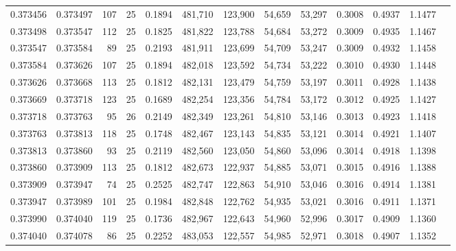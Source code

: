 \begin{tabular}{rrrrrrrrrrrrr}
0.373456 & 0.373497 &   107 &  25 &                                     0.1894 & 481,710 & 123,900 &  54,659 &  53,297 & 0.3008 & 0.4937 & 1.1477 \\
0.373498 & 0.373547 &   112 &  25 &                                     0.1825 & 481,822 & 123,788 &  54,684 &  53,272 & 0.3009 & 0.4935 & 1.1467 \\
0.373547 & 0.373584 &    89 &  25 &                                     0.2193 & 481,911 & 123,699 &  54,709 &  53,247 & 0.3009 & 0.4932 & 1.1458 \\
0.373584 & 0.373626 &   107 &  25 &                                     0.1894 & 482,018 & 123,592 &  54,734 &  53,222 & 0.3010 & 0.4930 & 1.1448 \\
0.373626 & 0.373668 &   113 &  25 &                                     0.1812 & 482,131 & 123,479 &  54,759 &  53,197 & 0.3011 & 0.4928 & 1.1438 \\
0.373669 & 0.373718 &   123 &  25 &                                     0.1689 & 482,254 & 123,356 &  54,784 &  53,172 & 0.3012 & 0.4925 & 1.1427 \\
0.373718 & 0.373763 &    95 &  26 &                                     0.2149 & 482,349 & 123,261 &  54,810 &  53,146 & 0.3013 & 0.4923 & 1.1418 \\
0.373763 & 0.373813 &   118 &  25 &                                     0.1748 & 482,467 & 123,143 &  54,835 &  53,121 & 0.3014 & 0.4921 & 1.1407 \\
0.373813 & 0.373860 &    93 &  25 &                                     0.2119 & 482,560 & 123,050 &  54,860 &  53,096 & 0.3014 & 0.4918 & 1.1398 \\
0.373860 & 0.373909 &   113 &  25 &                                     0.1812 & 482,673 & 122,937 &  54,885 &  53,071 & 0.3015 & 0.4916 & 1.1388 \\
0.373909 & 0.373947 &    74 &  25 &                                     0.2525 & 482,747 & 122,863 &  54,910 &  53,046 & 0.3016 & 0.4914 & 1.1381 \\
0.373947 & 0.373989 &   101 &  25 &                                     0.1984 & 482,848 & 122,762 &  54,935 &  53,021 & 0.3016 & 0.4911 & 1.1371 \\
0.373990 & 0.374040 &   119 &  25 &                                     0.1736 & 482,967 & 122,643 &  54,960 &  52,996 & 0.3017 & 0.4909 & 1.1360 \\
0.374040 & 0.374078 &    86 &  25 &                                     0.2252 & 483,053 & 122,557 &  54,985 &  52,971 & 0.3018 & 0.4907 & 1.1352 \\

\end{tabular}
